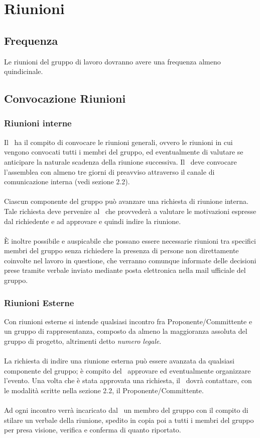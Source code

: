 \section{Riunioni}
\subsection{Frequenza}
Le riunioni del gruppo di lavoro dovranno avere una frequenza almeno quindicinale.
\subsection{Convocazione Riunioni}
\subsubsection{Riunioni interne}
Il \ruoloResponsabile\ ha il compito di convocare le riunioni generali, ovvero le riunioni in cui vengono convocati tutti i membri del gruppo, ed eventualmente di valutare se anticipare la naturale scadenza della riunione successiva. Il \ruoloResponsabile\ deve convocare l’assemblea con almeno tre giorni di preavviso attraverso il canale di comunicazione interna (vedi sezione 2.2). \\ \\
Ciascun componente del gruppo può avanzare una richiesta di riunione interna.
Tale richiesta deve pervenire al \ruoloResponsabile\ che provvederà a valutare le motivazioni espresse dal richiedente e ad approvare e quindi indire la riunione. \\ \\
È inoltre possibile e auspicabile che possano essere necessarie riunioni tra specifici membri del gruppo senza richiedere la presenza di persone non direttamente coinvolte nel lavoro in questione, che verranno comunque informate delle decisioni prese tramite verbale inviato mediante posta elettronica nella mail ufficiale del gruppo.

\subsubsection{Riunioni Esterne}
Con riunioni esterne si intende qualsiasi incontro fra Proponente/Committente
e un gruppo di rappresentanza, composto da almeno la maggioranza assoluta del
gruppo di progetto, altrimenti detto \textit{numero legale}.\\
\\
La richiesta di indire una riunione esterna può essere avanzata da qualsiasi componente del gruppo; è compito del \ruoloResponsabile\ approvare ed eventualmente organizzare l'evento. Una volta che è stata approvata una richiesta, il \ruoloResponsabile\ dovrà contattare, con le modalità scritte nella sezione 2.2, il Proponente/Committente.
\\\\
Ad ogni incontro verrà incaricato dal \ruoloResponsabile\ un membro del gruppo con il compito di stilare un verbale della riunione, spedito in copia poi a tutti i membri del gruppo per presa visione, verifica e conferma di quanto riportato.